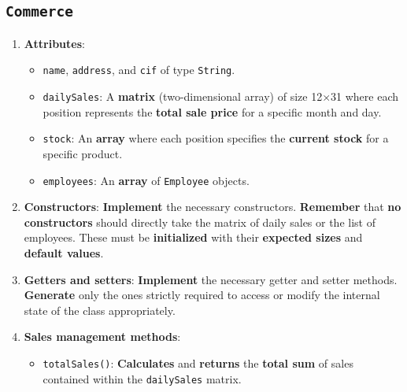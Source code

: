 \subsection{\texttt{Commerce}}

\begin{enumerate}

    \item \textbf{Attributes}:

        \begin{itemize}

            \item \texttt{name}, \texttt{address}, and \texttt{cif} of type \texttt{String}.

            \item \texttt{dailySales}: A \textbf{matrix} (two-dimensional array) of size 12×31 where each position represents the \textbf{total sale price} for a specific month and day.

            \item \texttt{stock}: An \textbf{array} where each position specifies the \textbf{current stock} for a specific product.

            \item \texttt{employees}: An \textbf{array} of \texttt{Employee} objects.

        \end{itemize}

    \item \textbf{Constructors}: \textbf{Implement} the necessary constructors. \textbf{Remember} that \textbf{no constructors} should directly take the matrix of daily sales or the list of employees. These must be \textbf{initialized} with their \textbf{expected sizes} and \textbf{default values}.

    \item \textbf{Getters and setters}: \textbf{Implement} the necessary getter and setter methods. \textbf{Generate} only the ones strictly required to access or modify the internal state of the class appropriately.

    \item \textbf{Sales management methods}:

        \begin{itemize}

            \item \texttt{totalSales()}: \textbf{Calculates} and \textbf{returns} the \textbf{total sum} of sales contained within the \texttt{dailySales} matrix.


\end{itemize}
\end{enumerate}
